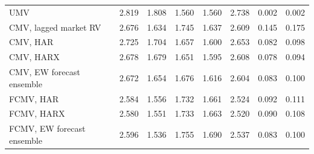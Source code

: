 \begin{table}[htbp]
\begin{tabular}{lrrrrrrr}
\hline
UMV & 2.819 & 1.808 & 1.560 & 1.560 & 2.738 & 0.002 & 0.002 \\
CMV, lagged market RV & 2.676 & 1.634 & 1.745 & 1.637 & 2.609 & 0.145 & 0.175 \\
CMV, HAR & 2.725 & 1.704 & 1.657 & 1.600 & 2.653 & 0.082 & 0.098 \\
CMV, HARX & 2.678 & 1.679 & 1.651 & 1.595 & 2.608 & 0.078 & 0.094 \\
CMV, EW forecast ensemble & 2.672 & 1.654 & 1.676 & 1.616 & 2.604 & 0.083 & 0.100 \\
FCMV, HAR & 2.584 & 1.556 & 1.732 & 1.661 & 2.524 & 0.092 & 0.111 \\
FCMV, HARX & 2.580 & 1.551 & 1.733 & 1.663 & 2.520 & 0.090 & 0.108 \\
FCMV, EW forecast ensemble & 2.596 & 1.536 & 1.755 & 1.690 & 2.537 & 0.083 & 0.100 \\
\hline
\end{tabular}
\end{table}
